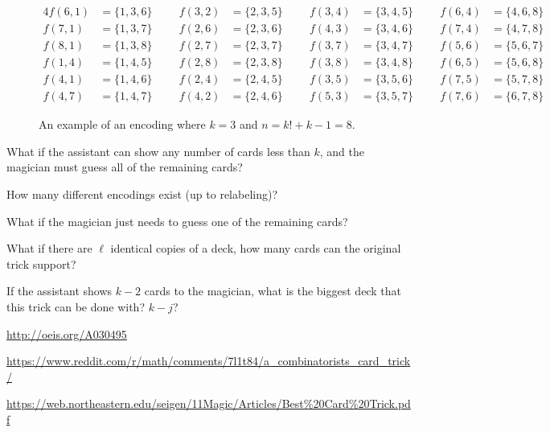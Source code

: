 \documentclass{article}
\begin{document}
\begin{figure}[!h]
\begin{alignat*}{4}
    f(6,1) &= \{1,3,6\} \hspace{1cm} f(3,2) &= \{2,3,5\} \hspace{1cm} f(3,4) &= \{3,4,5\} \hspace{1cm} f(6,4) &= \{4,6,8\}\\
    f(7,1) &= \{1,3,7\} \hspace{1cm} f(2,6) &= \{2,3,6\} \hspace{1cm} f(4,3) &= \{3,4,6\} \hspace{1cm} f(7,4) &= \{4,7,8\}\\
    f(8,1) &= \{1,3,8\} \hspace{1cm} f(2,7) &= \{2,3,7\} \hspace{1cm} f(3,7) &= \{3,4,7\} \hspace{1cm} f(5,6) &= \{5,6,7\}\\
    f(1,4) &= \{1,4,5\} \hspace{1cm} f(2,8) &= \{2,3,8\} \hspace{1cm} f(3,8) &= \{3,4,8\} \hspace{1cm} f(6,5) &= \{5,6,8\}\\
    f(4,1) &= \{1,4,6\} \hspace{1cm} f(2,4) &= \{2,4,5\} \hspace{1cm} f(3,5) &= \{3,5,6\} \hspace{1cm} f(7,5) &= \{5,7,8\}\\
    f(4,7) &= \{1,4,7\} \hspace{1cm} f(4,2) &= \{2,4,6\} \hspace{1cm} f(5,3) &= \{3,5,7\} \hspace{1cm} f(7,6) &= \{6,7,8\}
  \end{alignat*}
  \caption{
    An example of an encoding where $k=3$ and $n=k!+k-1=8$.
  }
\end{figure}

\begin{question}
  What if the assistant can show any number of cards less than $k$, and the
  magician must guess all of the remaining cards?
\end{question}
\begin{related}
  \item How many different encodings exist (up to relabeling)?
  \item What if the magician just needs to guess one of the remaining cards?
  \item What if there are $\ell$ identical copies of a deck, how many cards can
    the original trick support?
  \item If the assistant shows $k-2$ cards to the magician, what is the biggest
    deck that this trick can be done with? $k-j$?
\end{related}

\begin{references}
  \item \url{http://oeis.org/A030495}
  \item \url{https://www.reddit.com/r/math/comments/7l1t84/a_combinatorists_card_trick/}
  \item \url{https://web.northeastern.edu/seigen/11Magic/Articles/Best%20Card%20Trick.pdf}
\end{references}
\end{document}
